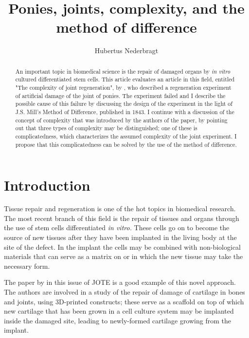 \documentclass[twocolumn, reflection, authordate, serif, seplic]{jote-article}
\title{Ponies, joints, complexity, and the method of difference}
\author[1]{Hubertus Nederbragt}
\affil[1]{Descartes Centre for the History and Philosophy of the Sciences and the Humanities, Utrecht University, Utrecht, the Netherlands}
\begin{document}
\begin{frontmatter}
\maketitle
\begin{abstract}
  
An important topic in biomedical science is the repair of damaged organs by \emph{in vitro} cultured differentiated stem cells. This article evaluates an article in this field, entitled "The complexity of joint regeneration", by \textcite{Diloksumpan2021}, who described a regeneration experiment of artificial damage of the joint of ponies. The experiment failed and I describe the possible cause of this failure by discussing the design of the experiment in the light of J.S. Mill's Method of Difference, published in 1843. I continue with a discussion of the concept of complexity that was introduced by the authors of the paper, by pointing out that three types of complexity may be distinguished; one of these is complicatedness, which characterizes the assumed complexity of the joint experiment. I propose that this complicatedness can be solved by the use of the method of difference.
 
\end{abstract}
\end{frontmatter}


 {}\section*{Introduction} 

Tissue repair and regeneration is one of the hot topics in biomedical research. The most recent branch of this field is the repair of tissues and organs through the use of stem cells differentiated \emph{in vitro.}
These cells go on to become the source of new tissues after they have been implanted in the living body at the site of the defect. In the implant the cells may be combined with non-biological materials that can serve as a matrix on or in which the new tissue may take the necessary form.

The paper by \textcite{Diloksumpan2021} in this issue of JOTE is a good example of this novel approach. The authors are involved in a study of the repair of damage of cartilage in bones and joints, using 3D-printed constructs; these serve as a scaffold on top of which new cartilage that has been grown in a cell culture system may be implanted inside the damaged site, leading to newly-formed cartilage growing from the implant.
\end{document}
